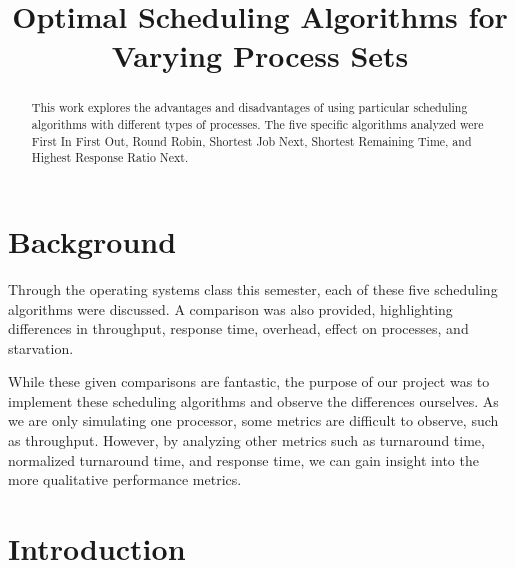 \documentclass[conference,11pt]{IEEEtran}
\begin{document}
%
\title{Optimal Scheduling Algorithms for Varying Process Sets}

\author{
}

\maketitle

\begin{abstract}
This work explores the advantages and disadvantages of using particular scheduling algorithms with different types of processes. The five specific algorithms analyzed were First In First Out, Round Robin, Shortest Job Next, Shortest Remaining Time, and Highest Response Ratio Next.
\end{abstract}

\section{Background}
Through the operating systems class this semester, each of these five scheduling algorithms were discussed. A comparison was also provided, highlighting differences in throughput, response time, overhead, effect on processes, and starvation.

While these given comparisons are fantastic, the purpose of our project was to implement these scheduling algorithms and observe the differences ourselves. As we are only simulating one processor, some metrics are difficult to observe, such as throughput. However, by analyzing other metrics such as turnaround time, normalized turnaround time, and response time, we can gain insight into the more qualitative performance metrics.

\section{Introduction}
\end{document}
